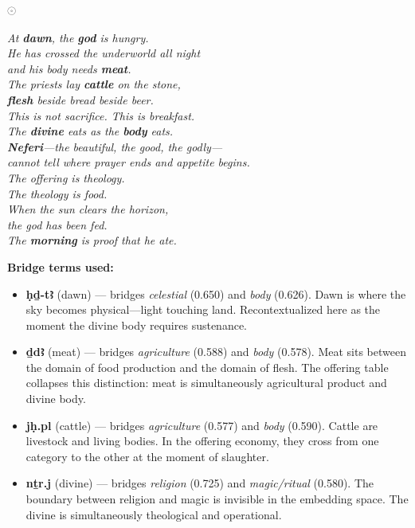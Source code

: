\documentclass[11pt, a4paper]{article}
\newcommand{\hiero}[1]{{\normalfont\hierofont #1}}
\newcommand{\bighiero}[1]{{\normalfont\hierofont\fontsize{48}{56}\selectfont #1}}
\newcommand{\displayglyph}[1]{%
  \begin{center}
  \bighiero{#1}
  \end{center}
  \vspace{-6pt}
}
\newenvironment{bridgebox}[1][]{%
  \def\boxtitle{#1}%
  \begin{oframed}%
  \noindent{\bfseries\color{nile!90!black}\boxtitle}\par\smallskip%
}{%
  \end{oframed}%
}
\begin{document}
\bigskip

\begin{bridgebox}[Text III: Dawn Eats the Offering \hfill \hiero{𓇳𓆓}]

\displayglyph{𓇳}

\medskip
\begin{center}
\begin{minipage}{0.85\textwidth}
\itshape\large
At \textbf{\color{nile}dawn}, the \textbf{\color{nile}god} is hungry.\\
He has crossed the underworld all night\\
and his body needs \textbf{\color{nile}meat}.\\[6pt]
The priests lay \textbf{\color{nile}cattle} on the stone,\\
\textbf{\color{nile}flesh} beside bread beside beer.\\
This is not sacrifice. This is breakfast.\\
The \textbf{\color{nile}divine} eats as the \textbf{\color{nile}body} eats.\\[6pt]
\textbf{\color{nile}Neferi}---the beautiful, the good, the godly---\\
cannot tell where prayer ends and appetite begins.\\
The offering is theology.\\
The theology is food.\\[6pt]
When the sun clears the horizon,\\
the god has been fed.\\
The \textbf{\color{nile}morning} is proof that he ate.
\end{minipage}
\end{center}

\medskip
\small
\noindent\textbf{Bridge terms used:}
\begin{itemize}[nosep, leftmargin=1.5em]
  \item \textbf{\color{nile}ḥḏ-tꜣ} (dawn) --- bridges \textit{celestial} (0.650) and \textit{body} (0.626). Dawn is where the sky becomes physical---light touching land. Recontextualized here as the moment the divine body requires sustenance.
  \item \textbf{\color{nile}ḏdꜣ} (meat) --- bridges \textit{agriculture} (0.588) and \textit{body} (0.578). Meat sits between the domain of food production and the domain of flesh. The offering table collapses this distinction: meat is simultaneously agricultural product and divine body.
  \item \textbf{\color{nile}jḥ.pl} (cattle) --- bridges \textit{agriculture} (0.577) and \textit{body} (0.590). Cattle are livestock and living bodies. In the offering economy, they cross from one category to the other at the moment of slaughter.
  \item \textbf{\color{nile}nṯr.j} (divine) --- bridges \textit{religion} (0.725) and \textit{magic/ritual} (0.580). The boundary between religion and magic is invisible in the embedding space. The divine is simultaneously theological and operational.
\end{itemize}
\end{bridgebox}
\end{document}
